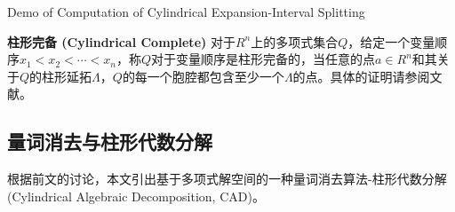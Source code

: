 \begin{example}
\begin{table}[]
    \centering
     {Demo of Computation of Cylindrical Expansion-Interval Splitting}
\label{tab:expansion}
\end{table}
\end{example}

\begin{definition}{\textbf{柱形完备 (Cylindrical Complete)}}
对于$R^n$上的多项式集合$Q$，给定一个变量顺序$x_1 < x_2 < \cdots < x_n$，称$Q$对于变量顺序是柱形完备的，当任意的点$a \in R^n$和其关于$Q$的柱形延拓$\Lambda$，$Q$的每一个胞腔都包含至少一个$\Lambda$的点。具体的证明请参阅文献\cite{Caviness2004QuantifierEA,Collins74}。
\end{definition}

\subsection{量词消去与柱形代数分解}
根据前文的讨论，本文引出基于多项式解空间的一种量词消去算法-柱形代数分解(Cylindrical Algebraic Decomposition, CAD)。

